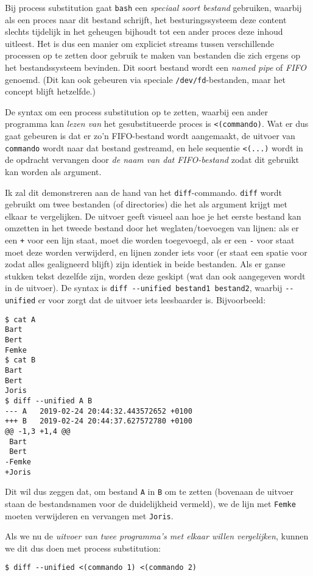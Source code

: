 \documentclass[a4paper,twoside,openany]{memoir}
\begin{document}
Bij process substitution gaat \verb!bash! een \emph{speciaal soort bestand}
gebruiken, waarbij als een proces naar dit bestand schrijft, het
besturingssysteem deze content slechts tijdelijk in het geheugen bijhoudt tot
een ander proces deze inhoud uitleest. Het is dus een manier om expliciet
streams tussen verschillende processen op te zetten door gebruik te maken van
bestanden die zich ergens op het bestandssysteem bevinden. Dit soort bestand
wordt een \emph{named pipe} of \emph{FIFO} genoemd. (Dit kan ook gebeuren via
speciale \verb!/dev/fd!-bestanden, maar het concept blijft hetzelfde.)

De syntax om een process substitution op te zetten, waarbij een ander programma
kan \emph{lezen van} het gesubstitueerde proces is \verb!<(commando)!. Wat er
dus gaat gebeuren is dat er zo'n FIFO-bestand wordt aangemaakt, de uitvoer van
\verb!commando! wordt naar dat bestand gestreamd, en hele sequentie
\verb!<(...)! wordt in de opdracht vervangen door \emph{de naam van dat
FIFO-bestand} zodat dit gebruikt kan worden als argument.

Ik zal dit demonstreren aan de hand van het \verb!diff!-commando. \verb!diff!
wordt gebruikt om twee bestanden (of directories) die het als argument krijgt
met elkaar te vergelijken. De uitvoer geeft visueel aan hoe je het eerste
bestand kan omzetten in het tweede bestand door het weglaten/toevoegen van
lijnen: als er een \verb!+! voor een lijn staat, moet die worden toegevoegd,
als er een \verb!-! voor staat moet deze worden verwijderd, en lijnen zonder
iets voor (er staat een spatie voor zodat alles gealigneerd blijft) zijn
identiek in beide bestanden. Als er ganse stukken tekst dezelfde zijn, worden
deze geskipt (wat dan ook aangegeven wordt in de uitvoer). De syntax is
\verb!diff --unified bestand1 bestand2!, waarbij \verb!--unified! er voor zorgt
dat de uitvoer iets leesbaarder is. Bijvoorbeeld:

\begin{verbatim}
$ cat A
Bart
Bert
Femke
$ cat B
Bart
Bert
Joris
$ diff --unified A B
--- A   2019-02-24 20:44:32.443572652 +0100
+++ B   2019-02-24 20:44:37.627572780 +0100
@@ -1,3 +1,4 @@
 Bart
 Bert
-Femke
+Joris
\end{verbatim}

Dit wil dus zeggen dat, om bestand \verb!A! in \verb!B! om te zetten (bovenaan
de uitvoer staan de bestandsnamen voor de duidelijkheid vermeld), we de lijn
met \verb!Femke! moeten verwijderen en vervangen met \verb!Joris!.

Als we nu de \emph{uitvoer van twee programma's met elkaar willen vergelijken},
kunnen we dit dus doen met process substitution:
\begin{verbatim}
$ diff --unified <(commando 1) <(commando 2)
\end{verbatim}
\end{document}
